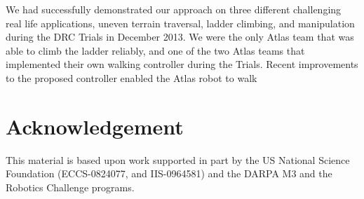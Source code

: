 \documentclass{ws-ijhr}
\begin{document}
We had successfully demonstrated our approach on three different challenging 
real life applications, uneven terrain traversal, ladder climbing, and 
manipulation during the DRC Trials in December 2013. 
We were the only Atlas team that was able to climb the ladder reliably, and one 
of the two Atlas teams that implemented their own walking controller during the
Trials. 
Recent improvements to the proposed controller enabled the Atlas robot to walk 
 

\section*{Acknowledgement}
This material is based upon work supported in part by the US National Science 
Foundation (ECCS-0824077, and IIS-0964581) and the DARPA M3 and the Robotics 
Challenge programs.
 

\end{document}
